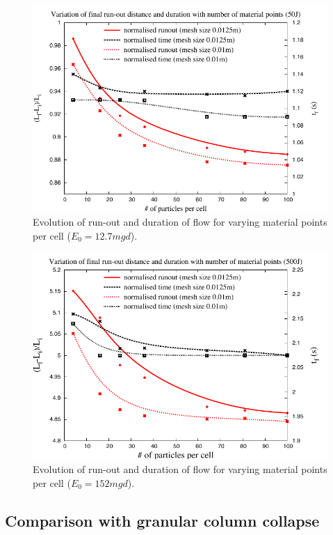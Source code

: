 \begin{figure}[tbhp]
\centering
\includegraphics[width=\textwidth]{50}
\caption{Evolution of run-out and duration of flow  for varying material points per cell ($E_0=12.7mgd$).}
\label{fig:50}
\end{figure}

\begin{figure}[tbhp]
\centering
\includegraphics[width=\textwidth]{500}
\caption{Evolution of run-out and duration of flow  for varying material points per cell ($E_0=152mgd$).}
\label{fig:500}
\end{figure}

\subsection{Comparison with granular column collapse}

